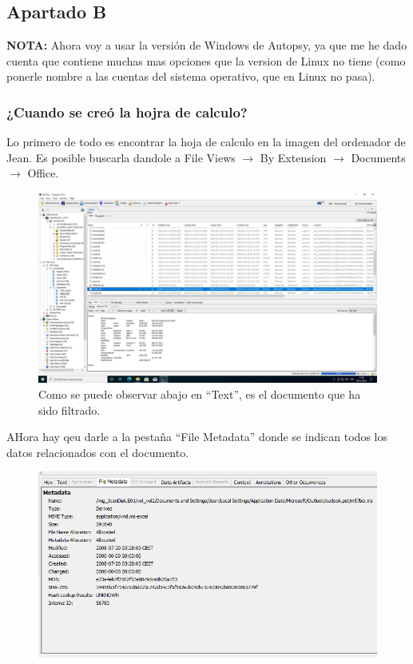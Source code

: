 \documentclass{article}
\begin{document}

\subsection*{Apartado B}

\textbf{NOTA: }Ahora voy a usar la versión de Windows de Autopsy, ya que me he dado cuenta que contiene muchas mas opciones que la version de Linux no tiene (como ponerle nombre a las cuentas del sistema operativo, que en Linux no pasa).

\subsubsection*{¿Cuando se creó la hojra de calculo?}

Lo primero de todo es encontrar la hoja de calculo en la imagen del ordenador de Jean. Es posible buscarla dandole a File Views $\rightarrow$ By Extension $\rightarrow$ Documents $\rightarrow$ Office.

\begin{figure}[H]
    \centering
    \includegraphics[width=\textwidth]{imagenes/Windows/Captura de pantalla (5).png}
    \caption{Como se puede observar abajo en ``Text'', es el documento que ha sido filtrado.}
\end{figure}

AHora hay qeu darle a la pestaña ``File Metadata'' donde se indican todos los datos relacionados con el documento.

\begin{figure}[H]
    \centering
    \includegraphics[width=\textwidth]{imagenes/Windows/Captura de pantalla (6).png}
\end{figure}
\end{document}
